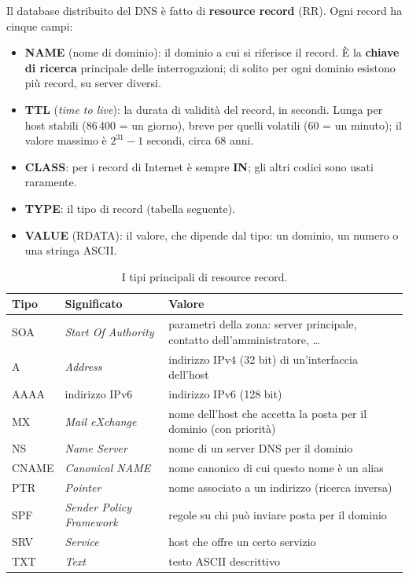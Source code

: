 Il database distribuito del DNS è fatto di \textbf{resource record} (RR). Ogni record ha cinque campi:

\begin{center}
\end{center}

\begin{itemize}
    \item \textbf{NAME} (nome di dominio): il dominio a cui si riferisce il record. È la \textbf{chiave di
          ricerca} principale delle interrogazioni; di solito per ogni dominio esistono più record, su server diversi.
    \item \textbf{TTL} (\emph{time to live}): la durata di validità del record, in secondi. Lunga per host stabili
          (86\,400 = un giorno), breve per quelli volatili (60 = un minuto); il valore massimo è $2^{31}-1$ secondi,
          circa 68 anni.
    \item \textbf{CLASS}: per i record di Internet è sempre \textbf{IN}; gli altri codici sono usati raramente.
    \item \textbf{TYPE}: il tipo di record (tabella seguente).
    \item \textbf{VALUE} (RDATA): il valore, che dipende dal tipo: un dominio, un numero o una stringa ASCII.
\end{itemize}

\begin{table}[H]
\centering
\begin{tabular}{lll}
\toprule
\textbf{Tipo} & \textbf{Significato} & \textbf{Valore} \\
\midrule
SOA & \emph{Start Of Authority} & parametri della zona: server principale, contatto dell'amministratore, \dots \\
A & \emph{Address} & indirizzo IPv4 (32 bit) di un'interfaccia dell'host \\
AAAA & indirizzo IPv6 & indirizzo IPv6 (128 bit) \\
MX & \emph{Mail eXchange} & nome dell'host che accetta la posta per il dominio (con priorità) \\
NS & \emph{Name Server} & nome di un server DNS per il dominio \\
CNAME & \emph{Canonical NAME} & nome canonico di cui questo nome è un alias \\
PTR & \emph{Pointer} & nome associato a un indirizzo (ricerca inversa) \\
SPF & \emph{Sender Policy Framework} & regole su chi può inviare posta per il dominio \\
SRV & \emph{Service} & host che offre un certo servizio \\
TXT & \emph{Text} & testo ASCII descrittivo \\
\bottomrule
\end{tabular}
\caption{I tipi principali di resource record.}
\end{table}

